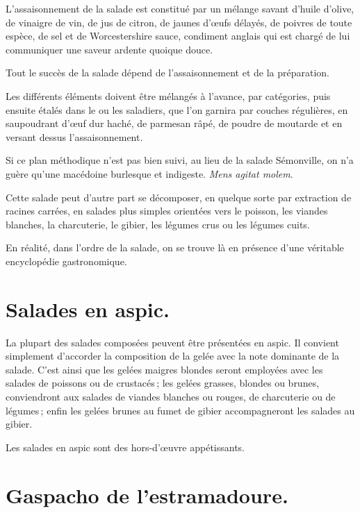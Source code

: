 L'assaisonnement de la salade est constitué par un mélange savant d'huile
d'olive, de vinaigre de vin, de jus de citron, de jaunes d'œufs délayés, de
poivres de toute espèce, de sel et de Worcestershire sauce, condiment anglais
qui est chargé de lui communiquer une saveur ardente quoique douce.

Tout le succès de la salade dépend de l'assaisonnement et de la préparation.

Les différents éléments doivent être mélangés à l'avance, par catégories, puis
ensuite étalés dans le ou les saladiers, que l'on garnira par couches
régulières, en saupoudrant d'œuf dur haché, de parmesan râpé, de poudre de
moutarde et en versant dessus l'assaisonnement.

Si ce plan méthodique n'est pas bien suivi, au lieu de la salade Sémonville, on
n'a guère qu'une macédoine burlesque et indigeste. \textit{Mens agitat molem}.

Cette salade peut d'autre part se décomposer, en quelque sorte par extraction
de racines carrées, en salades plus simples orientées vers le poisson, les
viandes blanches, la charcuterie, le gibier, les légumes crus ou les légumes
cuits.

En réalité, dans l’ordre de la salade, on se trouve là en présence d'une
véritable encyclopédie gastronomique.

\section*{\centering Salades en aspic.}
{}

La plupart des salades composées peuvent être présentées en aspic. Il convient
simplement d'accorder la composition de la gelée avec la note dominante de la
salade. C'est ainsi que les gelées maigres blondes seront employées avec les
salades de poissons ou de crustacés ; les gelées grasses, blondes ou brunes,
conviendront aux salades de viandes blanches ou rouges, de charcuterie ou de
légumes ; enfin les gelées brunes au fumet de gibier accompagneront les salades
au gibier.

\medskip

Les salades en aspic sont des hors-d'œuvre appétissants.

\section*{\centering Gaspacho de l'estramadoure.}
{}

